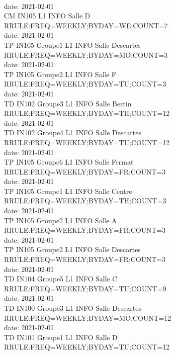 \documentclass{ltxdoc}
\begin{document}
\begin{center}
\\ date: 2021-02-01\\CM  IN105    L1 INFO  Salle D\\RRULE:FREQ=WEEKLY;BYDAY=WE;COUNT=7
\\ date: 2021-02-01\\TP  IN105  Groupe1  L1 INFO  Salle Descartes\\RRULE:FREQ=WEEKLY;BYDAY=MO;COUNT=3
\\ date: 2021-02-01\\TP  IN105  Groupe2  L1 INFO  Salle F\\RRULE:FREQ=WEEKLY;BYDAY=TU;COUNT=3
\\ date: 2021-02-01\\TD  IN102  Groupe3  L1 INFO  Salle Bertin\\RRULE:FREQ=WEEKLY;BYDAY=TH;COUNT=12
\\ date: 2021-02-01\\TD  IN102  Groupe4  L1 INFO  Salle Descartes\\RRULE:FREQ=WEEKLY;BYDAY=TU;COUNT=12
\\ date: 2021-02-01\\TP  IN105  Groupe6  L1 INFO  Salle Fermat\\RRULE:FREQ=WEEKLY;BYDAY=FR;COUNT=3
\\ date: 2021-02-01\\TP  IN105  Groupe1  L1 INFO  Salle Centre\\RRULE:FREQ=WEEKLY;BYDAY=TH;COUNT=3
\\ date: 2021-02-01\\TP  IN105  Groupe2  L1 INFO  Salle A\\RRULE:FREQ=WEEKLY;BYDAY=FR;COUNT=3
\\ date: 2021-02-01\\TP  IN105  Groupe2  L1 INFO  Salle Descartes\\RRULE:FREQ=WEEKLY;BYDAY=FR;COUNT=3
\\ date: 2021-02-01\\TD  IN104  Groupe5  L1 INFO  Salle C\\RRULE:FREQ=WEEKLY;BYDAY=TU;COUNT=9
\\ date: 2021-02-01\\TD  IN100  Groupe3  L1 INFO  Salle Descartes\\RRULE:FREQ=WEEKLY;BYDAY=MO;COUNT=12
\\ date: 2021-02-01\\TD  IN101  Groupe1  L1 INFO  Salle D\\RRULE:FREQ=WEEKLY;BYDAY=TU;COUNT=12

\end{center}
\end{document}

